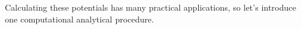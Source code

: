 Calculating these potentials has many practical applications, so let's introduce one computational analytical procedure.








